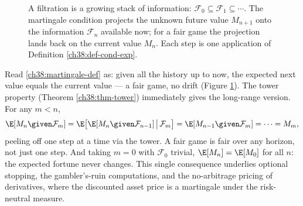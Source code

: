 \begin{figure}[H]
\centering
{}
\caption{A filtration is a growing stack of information: $\mathcal{F}_0 \subseteq \mathcal{F}_1
\subseteq \cdots$. The martingale condition projects the unknown future value $M_{n+1}$ onto the
information $\mathcal{F}_n$ available now; for a fair game the projection lands back on the current
value $M_n$. Each step is one application of Definition \ref{ch38:def-cond-exp}.}
\label{ch38:fig-filtration}
\end{figure}

\begin{applicationbox}
Read \eqref{ch38:martingale-def} as: given all the history up to now, the expected next value equals
the current value --- a fair game, no drift (Figure \ref{ch38:fig-filtration}). The tower property
(Theorem \ref{ch38:thm-tower}) immediately gives the long-range version. For any $m < n$,
\[
  \E[M_n \given \mathcal{F}_m]
  = \E\big[\E[M_n\given\mathcal{F}_{n-1}] \,\big|\, \mathcal{F}_m\big]
  = \E[M_{n-1}\given\mathcal{F}_m] = \cdots = M_m,
\]
peeling off one step at a time via the tower. A fair game is fair over any horizon, not just one step.
And taking $m=0$ with $\mathcal{F}_0$ trivial, $\E[M_n] = \E[M_0]$ for all $n$: the expected fortune
never changes. This single consequence underlies optional stopping, the gambler's-ruin computations,
and the no-arbitrage pricing of derivatives, where the discounted asset price is a martingale under
the risk-neutral measure.
\end{applicationbox}

